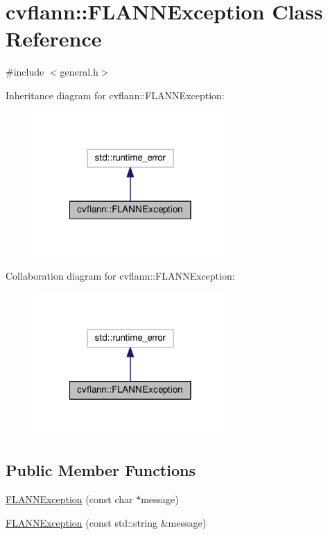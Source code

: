 \hypertarget{classcvflann_1_1FLANNException}{\section{cvflann\-:\-:F\-L\-A\-N\-N\-Exception Class Reference}
\label{classcvflann_1_1FLANNException}
}


{\ttfamily \#include $<$general.\-h$>$}



Inheritance diagram for cvflann\-:\-:F\-L\-A\-N\-N\-Exception\-:\nopagebreak
\begin{figure}[H]
\begin{center}
\leavevmode
\includegraphics[width=210pt]{classcvflann_1_1FLANNException__inherit__graph}
\end{center}
\end{figure}


Collaboration diagram for cvflann\-:\-:F\-L\-A\-N\-N\-Exception\-:\nopagebreak
\begin{figure}[H]
\begin{center}
\leavevmode
\includegraphics[width=210pt]{classcvflann_1_1FLANNException__coll__graph}
\end{center}
\end{figure}
\subsection*{Public Member Functions}
\begin{DoxyCompactItemize}
\item 
\hyperlink{classcvflann_1_1FLANNException_a4134f15e81ba8d20985064eabc3f9afa}{F\-L\-A\-N\-N\-Exception} (const char $\ast$message)
\item 
\hyperlink{classcvflann_1_1FLANNException_a9845b14c4a5e972c3c8b3370424a36b6}{F\-L\-A\-N\-N\-Exception} (const std\-::string \&message)
\end{DoxyCompactItemize}


